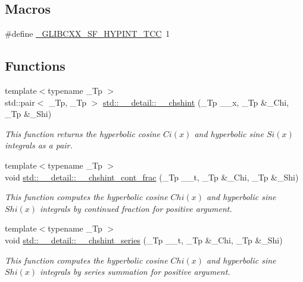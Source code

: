 \subsection*{Macros}
\begin{DoxyCompactItemize}
\item 
\#define \hyperlink{sf__hypint_8tcc_acf643c2e2a7b3fab7ab4a8be18e29584}{\+\_\+\+G\+L\+I\+B\+C\+X\+X\+\_\+\+S\+F\+\_\+\+H\+Y\+P\+I\+N\+T\+\_\+\+T\+C\+C}~1
\end{DoxyCompactItemize}
\subsection*{Functions}
\begin{DoxyCompactItemize}
\item 
{\footnotesize template$<$typename \+\_\+\+Tp $>$ }\\std\+::pair$<$ \+\_\+\+Tp, \+\_\+\+Tp $>$ \hyperlink{namespacestd_1_1____detail_aa07abc4dac6cf589ccd12d3ce40277cf}{std\+::\+\_\+\+\_\+detail\+::\+\_\+\+\_\+chshint} (\+\_\+\+Tp \+\_\+\+\_\+x, \+\_\+\+Tp \&\+\_\+\+Chi, \+\_\+\+Tp \&\+\_\+\+Shi)
\begin{DoxyCompactList}\small\item\em This function returns the hyperbolic cosine $ Ci(x) $ and hyperbolic sine $ Si(x) $ integrals as a pair. \end{DoxyCompactList}\item 
{\footnotesize template$<$typename \+\_\+\+Tp $>$ }\\void \hyperlink{namespacestd_1_1____detail_a07da2303d36d77bfad393a7b8ebdf686}{std\+::\+\_\+\+\_\+detail\+::\+\_\+\+\_\+chshint\+\_\+cont\+\_\+frac} (\+\_\+\+Tp \+\_\+\+\_\+t, \+\_\+\+Tp \&\+\_\+\+Chi, \+\_\+\+Tp \&\+\_\+\+Shi)
\begin{DoxyCompactList}\small\item\em This function computes the hyperbolic cosine $ Chi(x) $ and hyperbolic sine $ Shi(x) $ integrals by continued fraction for positive argument. \end{DoxyCompactList}\item 
{\footnotesize template$<$typename \+\_\+\+Tp $>$ }\\void \hyperlink{namespacestd_1_1____detail_a16055b6e4baa35ffe5c6d9495d9d0158}{std\+::\+\_\+\+\_\+detail\+::\+\_\+\+\_\+chshint\+\_\+series} (\+\_\+\+Tp \+\_\+\+\_\+t, \+\_\+\+Tp \&\+\_\+\+Chi, \+\_\+\+Tp \&\+\_\+\+Shi)
\begin{DoxyCompactList}\small\item\em This function computes the hyperbolic cosine $ Chi(x) $ and hyperbolic sine $ Shi(x) $ integrals by series summation for positive argument. \end{DoxyCompactList}\end{DoxyCompactItemize}


